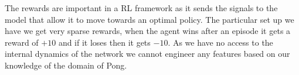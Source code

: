The rewards are important in a RL framework as it sends the signals to the model that allow it to move towards an optimal policy. The particular set up we have we get very sparse rewards, when the agent wins after an episode it gets a reward of $+10$ and if it loses then it gets $-10$. As we have no access to the internal dynamics of the network we cannot engineer any features based on our knowledge of the domain of Pong. 